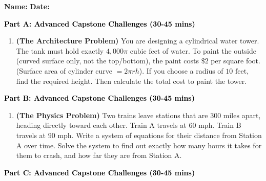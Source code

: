 \documentclass[12pt, letterpaper, fleqn]{article}
\begin{document}
\textbf{Name:} \underline{\hspace{5cm}}
\hfill
\textbf{Date:} \underline{\hspace{3cm}}\\


\begin{tcolorbox}[colback=customteal!20]
\large\textcolor{black}{\textbf{Part A: Advanced Capstone Challenges (30-45 mins)}}
\end{tcolorbox}

\vspace{3mm}

\begin{enumerate}[itemsep=5.5cm, leftmargin=0.6cm]
\item \textbf{(The Architecture Problem)} You are designing a cylindrical water tower. The tank must hold exactly $4,000\pi\text{ cubic feet}$ of water. To paint the outside (curved surface only, not the top/bottom), the paint costs $\$2$ per square foot. (Surface area of cylinder curve $= 2\pi r h$). If you choose a radius of $10\text{ feet}$, find the required height. Then calculate the total cost to paint the tower.
\end{enumerate}

\newpage

\begin{tcolorbox}[colback=customteal!20]
\large\textcolor{black}{\textbf{Part B: Advanced Capstone Challenges (30-45 mins)}}
\end{tcolorbox}

\vspace{3mm}

\begin{enumerate}[itemsep=5.5cm, leftmargin=0.6cm, resume]
\item \textbf{(The Physics Problem)} Two trains leave stations that are $300\text{ miles}$ apart, heading directly toward each other. Train A travels at $60\text{ mph}$. Train B travels at $90\text{ mph}$. Write a system of equations for their distance from Station A over time. Solve the system to find out exactly how many hours it takes for them to crash, and how far they are from Station A.
\end{enumerate}

\newpage

\begin{tcolorbox}[colback=customteal!20]
\large\textcolor{black}{\textbf{Part C: Advanced Capstone Challenges (30-45 mins)}}
\end{tcolorbox}
\end{document}

